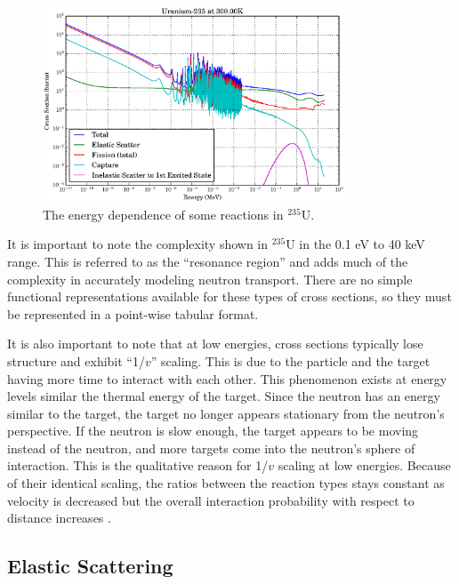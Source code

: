 \begin{figure}[h!]
  \centering
    \includegraphics[width=0.8\textwidth]{graphics/xs_u235.eps}
    \caption{The energy dependence of some reactions in $^{235}$U.   \label{xs_e_dependence_u}}
\end{figure}

It is important to note the complexity shown in $^{235}$U in the 0.1 eV to 40 keV range.  This is referred to as the ``resonance region'' and adds much of the complexity in accurately modeling neutron transport.  There are no simple functional representations available for these types of cross sections, so they must be represented in a point-wise tabular format.  

It is also important to note that at low energies, cross sections typically lose structure and exhibit ``1/$v$'' scaling.  This is due to the particle and the target having more time to interact with each other.  This phenomenon exists at energy levels similar the thermal energy of the target.  Since the neutron has an energy similar to the target, the target no longer appears stationary from the neutron's perspective.  If the neutron is slow enough, the target appears to be moving instead of the neutron, and more targets come into the neutron's sphere of interaction.  This is the qualitative reason for 1/$v$ scaling at low energies.  Because of their identical scaling, the ratios between the reaction types stays constant as velocity is decreased but the overall interaction probability with respect to distance increases \cite{duderstadt}.

\subsection{Elastic Scattering}


